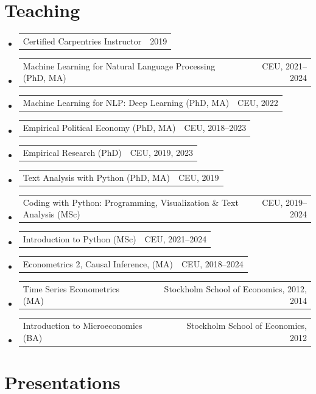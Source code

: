 \documentclass[10pt, a4paper]{article}
\makeatletter
\newcommand{\sans}{\fontfamily{phv}\selectfont}
\newcommand{\cvyear}[1]{%
  {\sans\fontsize{7.5}{9}\selectfont\color{inkfaint}#1}%
}
\newcommand{\cventry}[2]{%
  \noindent
  \begin{tabularx}{\textwidth}{@{}X@{\hspace{1em}}r@{}}
    #1 & \cvyear{#2}
  \end{tabularx}\vspace{1pt}%
}
\makeatother
\begin{document}
\section{Teaching}

\begin{itemize}
\item \cventry{Certified Carpentries Instructor}{2019}
\item \cventry{Machine Learning for Natural Language Processing (PhD, MA)}{CEU, 2021–2024}
\item \cventry{Machine Learning for NLP: Deep Learning  (PhD, MA)}{CEU, 2022}
\item \cventry{Empirical Political Economy (PhD, MA)}{CEU, 2018–2023}
\item \cventry{Empirical Research (PhD)}{CEU, 2019, 2023}
\item \cventry{Text Analysis with Python (PhD, MA)}{CEU, 2019}
\item \cventry{Coding with Python: Programming, Visualization \& Text Analysis  (MSc)}{CEU, 2019–2024}
\item \cventry{Introduction to Python (MSc)}{CEU, 2021–2024}
\item \cventry{Econometrics 2, Causal Inference, (MA)}{CEU, 2018–2024}
\item \cventry{Time Series Econometrics (MA)}{Stockholm School of Economics, 2012, 2014}
\item \cventry{Introduction to Microeconomics (BA)}{Stockholm School of Economics, 2012}

\end{itemize}

\section{Presentations}
\end{document}
